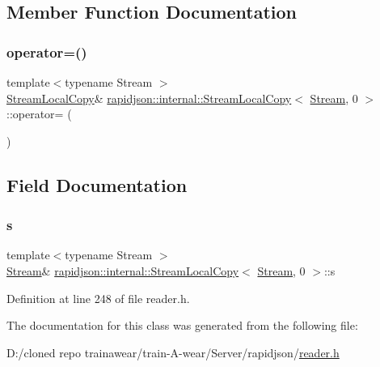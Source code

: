 \subsection{Member Function Documentation}
\mbox{\label{classrapidjson_1_1internal_1_1_stream_local_copy_3_01_stream_00_010_01_4_a37cdd0351d00b5d6b1568bc4b043f380}} 
\subsubsection{\texorpdfstring{operator=()}{operator=()}}
{\footnotesize\ttfamily template$<$typename Stream $>$ \\
\mbox{\hyperlink{classrapidjson_1_1internal_1_1_stream_local_copy}{Stream\+Local\+Copy}}\& \mbox{\hyperlink{classrapidjson_1_1internal_1_1_stream_local_copy}{rapidjson\+::internal\+::\+Stream\+Local\+Copy}}$<$ \mbox{\hyperlink{classrapidjson_1_1_stream}{Stream}}, 0 $>$\+::operator= (\begin{DoxyParamCaption}\item[{const \mbox{\hyperlink{classrapidjson_1_1internal_1_1_stream_local_copy}{Stream\+Local\+Copy}}$<$ \mbox{\hyperlink{classrapidjson_1_1_stream}{Stream}}, 0 $>$ \&}]{ }\end{DoxyParamCaption})\hspace{0.3cm}{\ttfamily [private]}}



\subsection{Field Documentation}
\mbox{\label{classrapidjson_1_1internal_1_1_stream_local_copy_3_01_stream_00_010_01_4_ac8d90f9a762431d66eb4bb18d5d2f6b4}} 
\subsubsection{\texorpdfstring{s}{s}}
{\footnotesize\ttfamily template$<$typename Stream $>$ \\
\mbox{\hyperlink{classrapidjson_1_1_stream}{Stream}}\& \mbox{\hyperlink{classrapidjson_1_1internal_1_1_stream_local_copy}{rapidjson\+::internal\+::\+Stream\+Local\+Copy}}$<$ \mbox{\hyperlink{classrapidjson_1_1_stream}{Stream}}, 0 $>$\+::s}



Definition at line 248 of file reader.\+h.



The documentation for this class was generated from the following file\+:\begin{DoxyCompactItemize}
\item 
D\+:/cloned repo trainawear/train-\/\+A-\/wear/\+Server/rapidjson/\mbox{\hyperlink{reader_8h}{reader.\+h}}\end{DoxyCompactItemize}
